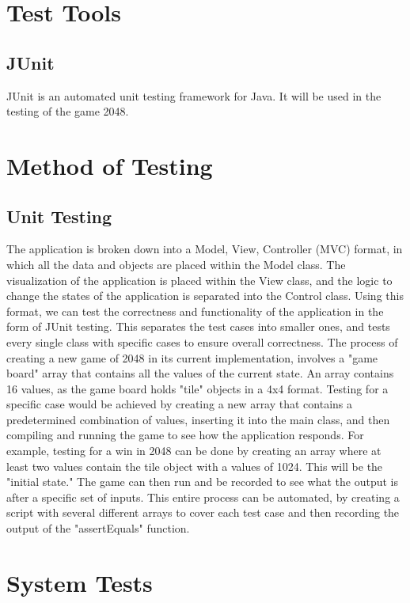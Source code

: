 \documentclass[12pt]{article}
\begin{document}
\section{Test Tools}

\subsection{JUnit}
JUnit is an automated unit testing framework for Java. It will be used in the
testing of the game 2048.
\section{Method of Testing}
\subsection{Unit Testing}
The application is broken down into a Model, View, Controller (MVC) format, in which all the data and objects are placed within the Model class. The visualization of the application is placed within the View class, and the logic to change the states of the application is separated into the Control class. Using this format, we can test the correctness and functionality of the application in the form of JUnit testing. This separates the test cases into smaller ones, and tests every single class with specific cases to ensure overall correctness. The process of creating a new game of 2048 in its current implementation, involves a "game board" array that contains all the values of the current state. An array contains 16 values, as the game board holds "tile" objects in a 4x4 format. Testing for a specific case would be achieved by creating a new array that contains a predetermined combination of values, inserting it into the main class, and then compiling and running the game to see how the application responds. For example, testing for a win in 2048 can be done by creating an array where at least two values contain the tile object with a values of 1024. This will be the "initial state." The game can then run and be recorded to see what the output is after a specific set of inputs. This entire process can be automated, by creating a script with several different arrays to cover each test case and then recording the output of the "assertEquals" function. \\

\section{System Tests}
\end{document}
